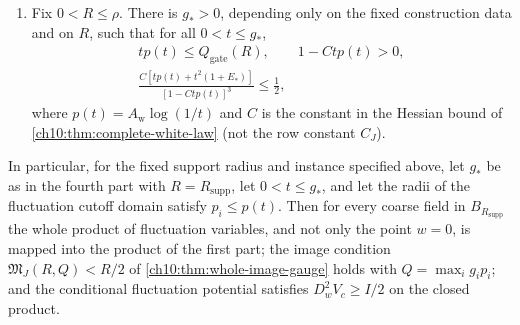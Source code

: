 \begin{lemma}
\begin{enumerate}
\item Fix $0<R\le\rho$. There is $g_*>0$, depending only on the fixed construction data and on $R$, such that for all $0<t\le g_*$,
\begin{equation}\label{ch13:eq:actual-shell-gates}
 \begin{gathered}
 tp(t)\le Q_{\mathrm{gate}}(R),\qquad1-Ctp(t)>0,\\
 \frac{C[tp(t)+t^2(1+E_*)]}{[1-Ctp(t)]^3}\le\frac12,
 \end{gathered}
\end{equation}
where $p(t)=A_{\mathrm w}\log(1/t)$ and $C$ is the constant in the Hessian bound of \cref{ch10:thm:complete-white-law} (not the row constant $C_J$).
\end{enumerate}
In particular, for the fixed support radius and instance specified above, let $g_*$ be as in the fourth part with $R=R_{\mathrm{supp}}$, let $0<t\le g_*$, and let the radii of the fluctuation cutoff domain satisfy $p_i\le p(t)$. Then for every coarse field in $B_{R_{\mathrm{supp}}}$ the whole product of fluctuation variables, and not only the point $w=0$, is mapped into the product of the first part; the image condition $\mathfrak M_J(R,Q)<R/2$ of \cref{ch10:thm:whole-image-gauge} holds with $Q=\max_ig_ip_i$; and the conditional fluctuation potential satisfies $D_w^2V_c\ge I/2$ on the closed product.
\end{lemma}


